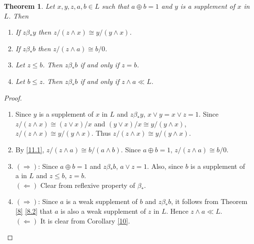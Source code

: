 \documentclass[11pt,reqno]{amsart} %
\theoremstyle{plain}
\newtheorem{theorem}{Theorem}
\theoremstyle{definition}
\theoremstyle{remark}
\numberwithin{equation}{section}
\begin{document}
\begin{theorem}\label{11}
  Let $ x,y,z,a,b \in L $ such that $ a \oplus b = 1 $ and $ y $ is a supplement of $ x $ in $ L $. Then
  \begin{enumerate}[label=\textnormal{(\arabic*)}]
    \item
      If $ z \beta_* y $ then $ z / \left(z \wedge x\right) \cong y / \left(y \wedge x\right) $. \label{11.1}
    \item
      If $ z \beta_* b $ then $ z / \left(z \wedge a\right) \cong b / 0 $. \label{11.2}
    \item
      Let $ z \leq b $. Then $ z \beta_* b $ if and only if $ z = b $.\label{11.3}
    \item
      Let $ b \leq z $. Then $ z \beta_* b $ if and only if $ z \wedge a \ll L $.\label{11.4}
  \end{enumerate}
\end{theorem}
\begin{proof}
  \begin{enumerate}
    \item
      Since $ y $ is a supplement of $ x $ in $ L $ and $ z \beta_* y $, 
      $ x \vee y = x \vee z = 1 $. Since $ z / \left(z  \wedge x\right) \cong \left(z \vee x\right) / x $ and 
      $ \left(y \vee x\right) / x \cong y / \left(y \wedge x\right) $, $ z / \left(z \wedge x\right) \cong y / \left(y \wedge x\right) $. 
      Thus $ z / \left(z \wedge x\right) \cong y / \left(y \wedge x\right) $.
    \item
      By \ref{11.1}, $ z / \left(z \wedge a\right) \cong b / \left(a \wedge b\right) $. Since $ a \oplus b = 1 $, 
      $ z / \left(z \wedge a\right) \cong b / 0 $.
    \item
      $ ( \Rightarrow ) $: 
      Since $ a \oplus b = 1 $ and $ z \beta_* b $, $ a \vee z = 1 $. Also, since $ b $ is a supplement of 
      a in $ L $ and $ z \leq b $, $ z = b $. \\
      $ ( \Leftarrow ) $ 
      Clear from reflexive property of $ \beta_* $.
    \item
      $ ( \Rightarrow ) $:
      Since $ a $ is a weak supplement of $ b $ and $ z \beta_* b $, it follows from 
      Theorem \ref{8} \ref{8.2} that $ a $ is also a weak supplement of $ z $ in $ L $. Hence $ z \wedge a \ll L $. \\
      $ ( \Leftarrow ) $ 
      It is clear from Corollary \ref{10}.
  \end{enumerate}
\end{proof}
\end{document}
